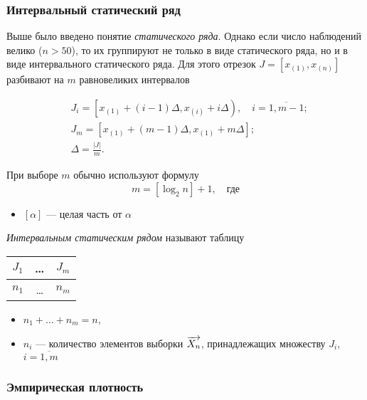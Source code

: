 \subsubsection{Интервальный статический ряд}

Выше было введено понятие \emph{статического ряда}. Однако если число наблюдений велико ($n > 50$), то их группируют не только в виде статического ряда, но и в виде интервального статического ряда. Для этого отрезок $J = [x_{(1)}, x_{(n)}]$ разбивают на $m$ равновеликих интервалов

\begin{align*}
	&J_i = \left[ x_{(1)} + (i - 1)\Delta, x_{(i)} + i\Delta \right), \quad i = \overline{1, m-1};
	\\
	&J_m = \left[ x_{(1)} + (m-1)\Delta, x_{(1)} + m\Delta  \right];
	\\
	&\Delta = \frac{|J|}{m}.
\end{align*}

\begin{rem}
	При выборе $m$ обычно используют формулу
	\begin{equation}
		m = [ \log_2 n ] + 1, \quad \text{где}
	\end{equation}
	\begin{itemize}
		\item $[\alpha]$ --- целая часть от $\alpha$
	\end{itemize}
\end{rem}

\begin{defn}
	\emph{Интервальным статическим рядом} называют таблицу
	\begin{center}
			\begin{tabular}{| c | c | c |}
				\hline
				$J_1$ & \ldots & $J_m$ \\
				\hline
				$n_1$ & \ldots & $n_m$ \\
				\hline
			\end{tabular}
	\end{center}
	\begin{itemize}
		\item $n_1 + \dots + n_m = n$,
		\item $n_i$ --- количество элементов выборки $\overrightarrow{X_n}$, принадлежащих множеству $J_i$, $i = \overline{1, m}$
	\end{itemize}
\end{defn}


\subsubsection{Эмпирическая плотность}

